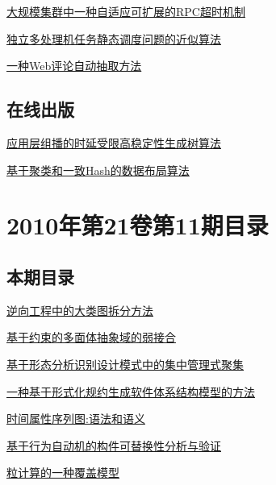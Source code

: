 \documentclass[a4paper]{article}
\begin{document}
\href{http://www.jos.org.cn/ch/reader/download_pdf.aspx?file_no=3718&year_id=2010&quarter_id=12&falg=1}{大规模集群中一种自适应可扩展的RPC超时机制}

\href{http://www.jos.org.cn/ch/reader/download_pdf.aspx?file_no=3764&year_id=2010&quarter_id=12&falg=1}{独立多处理机任务静态调度问题的近似算法}

\href{http://www.jos.org.cn/ch/reader/download_pdf.aspx?file_no=3961&year_id=2010&quarter_id=12&falg=1}{一种Web评论自动抽取方法}

\subsection{在线出版}
\href{http://www.jos.org.cn/ch/reader/download_pdf.aspx?file_no=3650&year_id=2010&quarter_id=12&falg=1}{应用层组播的时延受限高稳定性生成树算法}

\href{http://www.jos.org.cn/ch/reader/download_pdf.aspx?file_no=3706&year_id=2010&quarter_id=12&falg=1}{基于聚类和一致Hash的数据布局算法}


\section{\textbf{2010年第21卷第11期目录}}
\subsection{本期目录}
\href{http://www.jos.org.cn/ch/reader/download_pdf.aspx?file_no=3660&year_id=2010&quarter_id=11&falg=1}{逆向工程中的大类图拆分方法}

\href{http://www.jos.org.cn/ch/reader/download_pdf.aspx?file_no=3664&year_id=2010&quarter_id=11&falg=1}{基于约束的多面体抽象域的弱接合}

\href{http://www.jos.org.cn/ch/reader/download_pdf.aspx?file_no=3680&year_id=2010&quarter_id=11&falg=1}{基于形态分析识别设计模式中的集中管理式聚集}

\href{http://www.jos.org.cn/ch/reader/download_pdf.aspx?file_no=3701&year_id=2010&quarter_id=11&falg=1}{一种基于形式化规约生成软件体系结构模型的方法}

\href{http://www.jos.org.cn/ch/reader/download_pdf.aspx?file_no=3711&year_id=2010&quarter_id=11&falg=1}{时间属性序列图:语法和语义}

\href{http://www.jos.org.cn/ch/reader/download_pdf.aspx?file_no=3780&year_id=2010&quarter_id=11&falg=1}{基于行为自动机的构件可替换性分析与验证}

\href{http://www.jos.org.cn/ch/reader/download_pdf.aspx?file_no=3663&year_id=2010&quarter_id=11&falg=1}{粒计算的一种覆盖模型}
\end{document}
